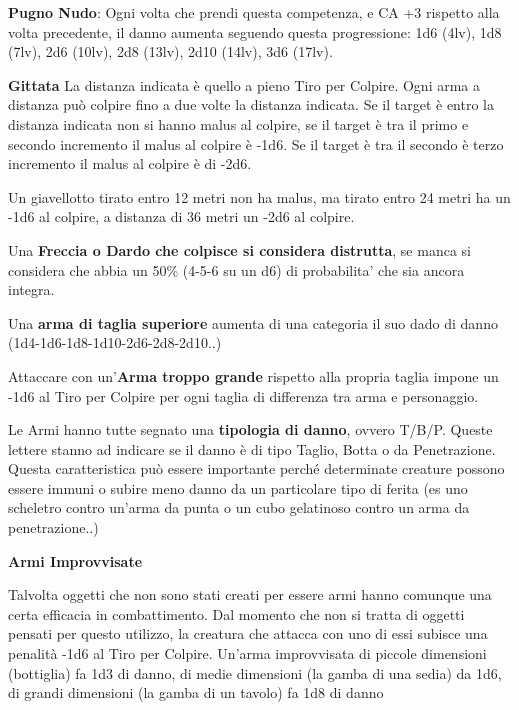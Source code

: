 \documentclass[a4paper,11pt,twoside,openany]{book}
\begin{document}
\textbf{Pugno Nudo}: Ogni volta che prendi questa competenza, e CA +3 rispetto alla volta precedente, il danno aumenta seguendo questa progressione: 1d6 (4lv), 1d8 (7lv), 2d6 (10lv), 2d8 (13lv), 2d10 (14lv), 3d6 (17lv).

\bigskip

\textbf{Gittata}
La distanza indicata è quello a pieno Tiro per Colpire. Ogni arma a distanza può colpire  fino a due volte la distanza indicata. Se il target è entro la distanza indicata non si hanno malus al colpire, se il target è tra il primo e secondo incremento il malus al colpire è -1d6. Se il target è tra il secondo è terzo incremento il malus al colpire è di -2d6.

Un giavellotto tirato entro 12 metri non ha malus, ma tirato entro 24 metri ha un -1d6 al colpire, a distanza di 36 metri un -2d6 al colpire.

\medskip


Una \textbf{Freccia o Dardo che colpisce si considera distrutta}, se manca si considera che abbia un 50\% (4-5-6 su un d6) di probabilita' che sia ancora integra.

\medskip

Una \textbf{arma di taglia superiore} aumenta di una categoria il suo dado di danno (1d4-1d6-1d8-1d10-2d6-2d8-2d10..)

\medskip

Attaccare con un'\textbf{Arma troppo grande} rispetto alla propria taglia impone un -1d6 al Tiro per Colpire per ogni taglia di differenza tra arma e personaggio.

\medskip

Le Armi hanno tutte segnato una \textbf{tipologia di danno}, ovvero T/B/P. 	Queste lettere stanno ad indicare se il danno è di tipo Taglio, Botta 	o da Penetrazione. Questa caratteristica può essere importante perché 	determinate creature possono essere immuni o subire meno danno da 	un particolare tipo di ferita (es uno scheletro contro un'arma da 	punta o un cubo gelatinoso contro un arma da penetrazione..)

\medskip

\textbf{Armi Improvvisate}

Talvolta oggetti che non sono stati creati per essere armi hanno comunque una certa efficacia in combattimento. Dal momento che non si tratta di oggetti pensati per questo utilizzo, la creatura che attacca con uno di essi subisce una penalità -1d6 al Tiro per Colpire. Un'arma improvvisata di piccole dimensioni (bottiglia) fa 1d3 di danno, di medie dimensioni (la gamba di una sedia) da 1d6, di grandi dimensioni (la gamba di un tavolo) fa 1d8 di danno
\end{document}
